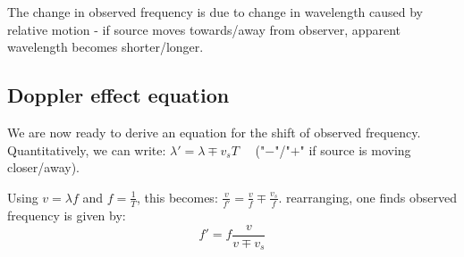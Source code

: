 \documentclass[a4paper,12pt]{book}
\newcommand{\syl}[1]{\footnote{Specification statement: #1}}
\renewenvironment{marginfigure}[1][]{\begin{figure}[htbp]\centering}{\end{figure}}
\newcommand{\tcbhighmath}[1]{\boxed{#1}}
\newcommand{\syl}[1]{\footnote{\textit{Spec: #1}}}
\begin{document}
The change in observed frequency is due to change in wavelength caused by relative motion - if source moves towards/away from observer, apparent wavelength becomes shorter/longer.

\subsection*{Doppler effect equation}

We are now ready to derive an equation for the shift of observed frequency. 
Quantitatively, we can write: $\lambda' = \lambda \mp v_s T \quad$ ("$-$"/"$+$" if source is moving closer/away).

Using $v = \lambda f$ and $f=\frac{1}{T}$, this becomes: $ \frac{v}{f'} = \frac{v}{f} \mp \frac{v_s}{f} $.
rearranging, one finds observed frequency is given by: $$\tcbhighmath{f' = f\frac{v}{v \mp v_s}}$$

    





\end{document}
